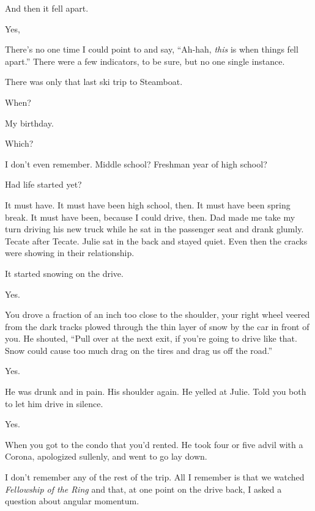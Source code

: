 \begin{paracol}{2}
\begin{leftcolumn}
And then it fell apart.

\begin{ally}
Yes,
\end{ally}
There's no one time I could point to and say, ``Ah-hah, \emph{this} is when things fell apart.'' There were a few indicators, to be sure, but no one single instance.

There was only that last ski trip to Steamboat.

\begin{ally}
When?
\end{ally}
My birthday.

\begin{ally}
Which?
\end{ally}
I don't even remember. Middle school? Freshman year of high school?

\begin{ally}
Had life started yet?
\end{ally}
It must have. It must have been high school, then. It must have been spring break. It must have been, because I could drive, then. Dad made me take my turn driving his new truck while he sat in the passenger seat and drank glumly. Tecate after Tecate. Julie sat in the back and stayed quiet. Even then the cracks were showing in their relationship.

\begin{ally}
It started snowing on the drive.
\end{ally}
Yes.

\begin{ally}
You drove a fraction of an inch too close to the shoulder, your right wheel veered from the dark tracks plowed through the thin layer of snow by the car in front of you. He shouted, ``Pull over at the next exit, if you're going to drive like that. Snow could cause too much drag on the tires and drag us off the road.''
\end{ally}
Yes.

\begin{ally}
He was drunk and in pain. His shoulder again. He yelled at Julie. Told you both to let him drive in silence.
\end{ally}
Yes.

\begin{ally}
When you got to the condo that you'd rented. He took four or five advil with a Corona, apologized sullenly, and went to go lay down.
\end{ally}
I don't remember any of the rest of the trip. All I remember is that we watched \emph{Fellowship of the Ring} and that, at one point on the drive back, I asked a question about angular momentum.


\end{leftcolumn}
\end{paracol}

